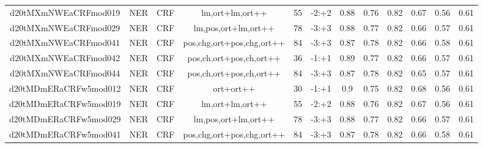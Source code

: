 \documentclass[a4paper]{article}
\begin{document}
\begin{landscape}
\begin{center}
\begin{tabular}{ |c|c|c|c|c|c|c|c|c|c|c|c|}
 
 	
 	\small{ d20tMXmNWEaCRFmod019 } & \small{ NER} & \small{  CRF }  & lm,ort+lm,ort++  &  55 &  \small{  -2:+2 }  &  0.88 & 0.76 & 0.82  &  0.67 & 0.56 & 0.61 \\
 	

 
 	
 	\small{ d20tMXmNWEaCRFmod029 } & \small{ NER} & \small{  CRF }  & lm,pos,ort+lm,ort++  &  78 &  \small{  -3:+3 }  &  0.88 & 0.77 & 0.82  &  0.66 & 0.57 & 0.61 \\
 	

 
 	
 	\small{ d20tMXmNWEaCRFmod041 } & \small{ NER} & \small{  CRF }  & pos,chg,ort+pos,chg,ort++  &  84 &  \small{  -3:+3 }  &  0.87 & 0.78 & 0.82  &  0.66 & 0.58 & 0.61 \\
 	

 
 	
 	\small{ d20tMXmNWEaCRFmod042 } & \small{ NER} & \small{  CRF }  & pos,ch,ort+pos,ch,ort++  &  36 &  \small{  -1:+1 }  &  0.89 & 0.77 & 0.82  &  0.66 & 0.57 & 0.61 \\
 	

 
 	
 	\small{ d20tMXmNWEaCRFmod044 } & \small{ NER} & \small{  CRF }  & pos,ch,ort+pos,ch,ort++  &  84 &  \small{  -3:+3 }  &  0.87 & 0.78 & 0.82  &  0.65 & 0.57 & 0.61 \\
 	

 
 	
 	\small{ d20tMDmERaCRFw5mod012 } & \small{ NER} & \small{  CRF }  & ort+ort++  &  30 &  \small{  -1:+1 }  &  0.9 & 0.75 & 0.82  &  0.68 & 0.56 & 0.61 \\
 	

 
 	
 	\small{ d20tMDmERaCRFw5mod019 } & \small{ NER} & \small{  CRF }  & lm,ort+lm,ort++  &  55 &  \small{  -2:+2 }  &  0.88 & 0.76 & 0.82  &  0.67 & 0.56 & 0.61 \\
 	

 
 	
 	\small{ d20tMDmERaCRFw5mod029 } & \small{ NER} & \small{  CRF }  & lm,pos,ort+lm,ort++  &  78 &  \small{  -3:+3 }  &  0.88 & 0.77 & 0.82  &  0.66 & 0.57 & 0.61 \\
 	

 
 	
 	\small{ d20tMDmERaCRFw5mod041 } & \small{ NER} & \small{  CRF }  & pos,chg,ort+pos,chg,ort++  &  84 &  \small{  -3:+3 }  &  0.87 & 0.78 & 0.82  &  0.66 & 0.58 & 0.61 \\
 	


\end{tabular}
\end{center}
\end{landscape}
\end{document}
